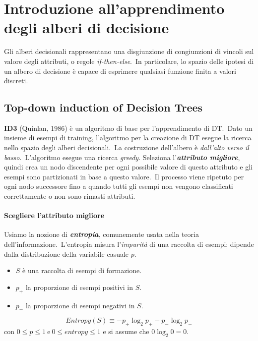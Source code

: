 \chapter{Introduzione all'apprendimento degli alberi di decisione}

Gli alberi decisionali rappresentano una disgiunzione di congiunzioni di vincoli sul valore degli attributi, o regole \textit{if-then-else}.\
In particolare, lo spazio delle ipotesi di un albero di decisione è capace di esprimere qualsiasi funzione finita a valori discreti.\

\section{Top-down induction of Decision Trees}

\textbf{ID3} (Quinlan, 1986) è un algoritmo di base per l'apprendimento di DT.\
Dato un insieme di esempi di training, l'algoritmo per la creazione di DT esegue la ricerca nello spazio degli alberi decisionali.\
La costruzione dell'albero è \textit{dall'alto verso il basso}.\
L'algoritmo esegue una ricerca \textit{greedy}.
Seleziona l'\textbf{\textit{attributo migliore}}, quindi crea un nodo discendente per ogni possibile valore di questo attributo e gli esempi sono partizionati in base a questo valore.\
Il processo viene ripetuto per ogni nodo successore fino a quando tutti gli esempi non vengono classificati correttamente o non sono rimasti attributi.\

\subsubsection{Scegliere l'attributo migliore}

Usiamo la nozione di \textbf{\textit{entropia}}, comunemente usata nella teoria dell'informazione.\
L'entropia misura l'\textit{impurità} di una raccolta di esempi; dipende dalla distribuzione della variabile casuale $p$.
\begin{itemize}
	\item $S$ è una raccolta di esempi di formazione.
	\item $p_+$ la proporzione di esempi positivi in $S$.
	\item $p_-$ la proporzione di esempi negativi in $S$.
\end{itemize}
\[\mathit{Entropy}(S) \equiv -p_+\log_2 p_+ - p_-\log_2 p_- \]
con $0\leq p \leq 1\ \mathrm{e}\ 0\leq entropy \leq 1$ e si assume che $0 \log_2 0 =0$.\

